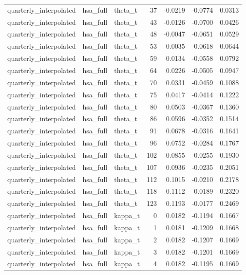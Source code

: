 \begin{tabular}{lllrrrr}
quarterly\_interpolated & hsa\_full & theta\_t & 37 & -0.0219 & -0.0774 & 0.0313 \\
quarterly\_interpolated & hsa\_full & theta\_t & 43 & -0.0126 & -0.0700 & 0.0426 \\
quarterly\_interpolated & hsa\_full & theta\_t & 48 & -0.0047 & -0.0651 & 0.0529 \\
quarterly\_interpolated & hsa\_full & theta\_t & 53 & 0.0035 & -0.0618 & 0.0644 \\
quarterly\_interpolated & hsa\_full & theta\_t & 59 & 0.0134 & -0.0558 & 0.0792 \\
quarterly\_interpolated & hsa\_full & theta\_t & 64 & 0.0226 & -0.0505 & 0.0947 \\
quarterly\_interpolated & hsa\_full & theta\_t & 70 & 0.0331 & -0.0459 & 0.1088 \\
quarterly\_interpolated & hsa\_full & theta\_t & 75 & 0.0417 & -0.0414 & 0.1222 \\
quarterly\_interpolated & hsa\_full & theta\_t & 80 & 0.0503 & -0.0367 & 0.1360 \\
quarterly\_interpolated & hsa\_full & theta\_t & 86 & 0.0596 & -0.0352 & 0.1514 \\
quarterly\_interpolated & hsa\_full & theta\_t & 91 & 0.0678 & -0.0316 & 0.1641 \\
quarterly\_interpolated & hsa\_full & theta\_t & 96 & 0.0752 & -0.0284 & 0.1767 \\
quarterly\_interpolated & hsa\_full & theta\_t & 102 & 0.0855 & -0.0255 & 0.1930 \\
quarterly\_interpolated & hsa\_full & theta\_t & 107 & 0.0936 & -0.0235 & 0.2051 \\
quarterly\_interpolated & hsa\_full & theta\_t & 112 & 0.1015 & -0.0210 & 0.2178 \\
quarterly\_interpolated & hsa\_full & theta\_t & 118 & 0.1112 & -0.0189 & 0.2320 \\
quarterly\_interpolated & hsa\_full & theta\_t & 123 & 0.1193 & -0.0177 & 0.2469 \\
quarterly\_interpolated & hsa\_full & kappa\_t & 0 & 0.0182 & -0.1194 & 0.1667 \\
quarterly\_interpolated & hsa\_full & kappa\_t & 1 & 0.0181 & -0.1209 & 0.1668 \\
quarterly\_interpolated & hsa\_full & kappa\_t & 2 & 0.0182 & -0.1207 & 0.1669 \\
quarterly\_interpolated & hsa\_full & kappa\_t & 3 & 0.0182 & -0.1201 & 0.1669 \\
quarterly\_interpolated & hsa\_full & kappa\_t & 4 & 0.0182 & -0.1195 & 0.1669 \\

\end{tabular}
